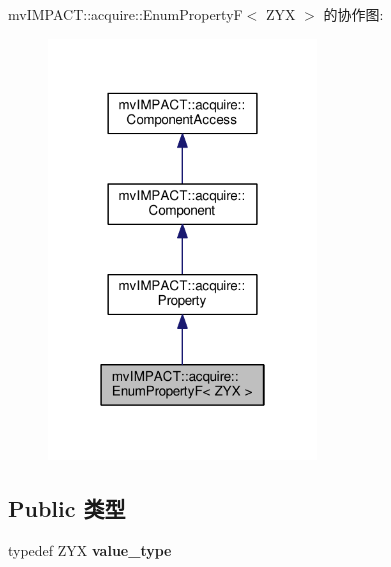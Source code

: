mv\+I\+M\+P\+A\+C\+T\+:\+:acquire\+:\+:Enum\+Property\+F$<$ Z\+Y\+X $>$ 的协作图\+:
\nopagebreak
\begin{figure}[H]
\begin{center}
\leavevmode
\includegraphics[width=202pt]{classmv_i_m_p_a_c_t_1_1acquire_1_1_enum_property_f__coll__graph}
\end{center}
\end{figure}
\subsection*{Public 类型}
\begin{DoxyCompactItemize}
\item 
\hypertarget{classmv_i_m_p_a_c_t_1_1acquire_1_1_enum_property_f_a72a8a66640f469319598f9826fc369b7}{typedef Z\+Y\+X {\bfseries value\+\_\+type}}\label{classmv_i_m_p_a_c_t_1_1acquire_1_1_enum_property_f_a72a8a66640f469319598f9826fc369b7}

\end{DoxyCompactItemize}
